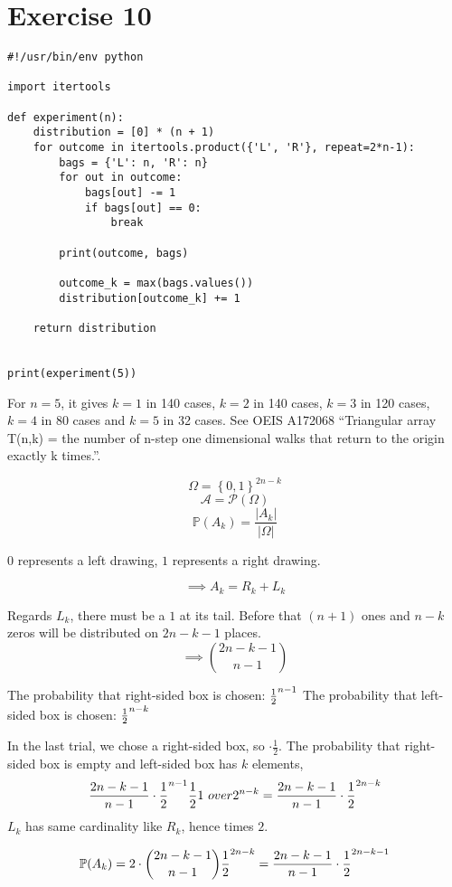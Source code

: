 \documentclass{article}
\newcommand\set[1]{\left\{#1\right\}}
\newcommand\card[1]{\left|#1\right|}
\begin{document}
\section{Exercise 10}

\begin{verbatim}
#!/usr/bin/env python

import itertools

def experiment(n):
    distribution = [0] * (n + 1)
    for outcome in itertools.product({'L', 'R'}, repeat=2*n-1):
        bags = {'L': n, 'R': n}
        for out in outcome:
            bags[out] -= 1
            if bags[out] == 0:
                break

        print(outcome, bags)

        outcome_k = max(bags.values())
        distribution[outcome_k] += 1

    return distribution


print(experiment(5))
\end{verbatim}

For $n=5$, it gives $k=1$ in 140 cases, $k=2$ in 140 cases, $k=3$ in 120 cases, $k=4$ in 80 cases and $k=5$ in 32 cases.
See OEIS A172068 \enquote{Triangular array T(n,k) = the number of n-step one dimensional walks that return to the origin exactly k times.}.


\[ \Omega = \set{0,1}^{2n-k} \]
\[ \mathcal A = \mathcal P(\Omega) \]
\[ \mathbb P(A_k) = \frac{\card{A_k}}{\card{\Omega}} \]

$0$ represents a left drawing, $1$ represents a right drawing.

\[ \implies A_k = R_k + L_k \]

Regards $L_k$, there must be a $1$ at its tail.
Before that $(n+1)$ ones and $n-k$ zeros will be distributed on $2n - k - 1$ places.
\[ \implies {2n-k-1 \choose n-1} \]



The probability that right-sided box is chosen: ${1 \over 2}^{n-1}$
The probability that left-sided box is chosen: ${1 \over 2}^{n-k}$

In the last trial, we chose a right-sided box, so $\cdot \frac12$.
The probability that right-sided box is empty and left-sided box has
$k$ elements,
\[
  {2n - k - 1 \over n-1} \cdot {1 \over 2}^{n-1} {1 \over 2} {1 \ over 2}^{n-k} = {2n-k-1 \over n-1} \cdot {1 \over 2}^{2n-k}
\]
$L_k$ has same cardinality like $R_k$, hence times $2$.

\[
  \mathbb P(A_k) = 2 \cdot {2n-k-1 \choose n-1} {1 \over 2}^{2n-k} = {2n-k-1 \over n-1} \cdot {1 \over 2}^{2n-k-1}
\]
\end{document}
